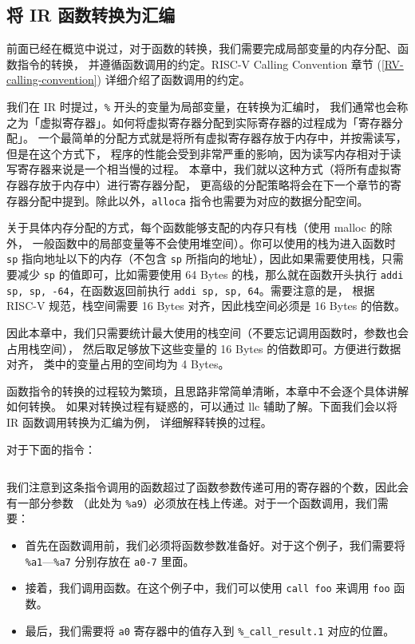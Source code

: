 \subsection{将 IR 函数转换为汇编}\label{IR-func-to-asm}

前面已经在概览中说过，对于函数的转换，我们需要完成局部变量的内存分配、函数指令的转换，
并遵循函数调用的约定。RISC-V Calling Convention 章节
(\ref{RV-calling-convention}) 详细介绍了函数调用的约定。

我们在 IR 时提过，\texttt{\%} 开头的变量为局部变量，在转换为汇编时，
我们通常也会称之为「虚拟寄存器」。如何将虚拟寄存器分配到实际寄存器的过程成为「寄存器分配」。
一个最简单的分配方式就是将所有虚拟寄存器存放于内存中，并按需读写，但是在这个方式下，
程序的性能会受到非常严重的影响，因为读写内存相对于读写寄存器来说是一个相当慢的过程。
本章中，我们就以这种方式（将所有虚拟寄存器存放于内存中）进行寄存器分配，
更高级的分配策略将会在下一个章节的寄存器分配中提到。除此以外，\texttt{alloca}
指令也需要为对应的数据分配空间。

关于具体内存分配的方式，每个函数能够支配的内存只有栈（使用 malloc 的除外，
一般函数中的局部变量等不会使用堆空间）。你可以使用的栈为进入函数时 \texttt{sp}
指向地址以下的内存（不包含 \texttt{sp} 所指向的地址），因此如果需要使用栈，只需要减少
\texttt{sp} 的值即可，比如需要使用 64 Bytes 的栈，那么就在函数开头执行
\texttt{addi sp, sp, -64}，在函数返回前执行 \texttt{addi sp, sp, 64}。需要注意的是，
根据 RISC-V 规范，栈空间需要 16 Bytes 对齐，因此栈空间必须是 16 Bytes 的倍数。

因此本章中，我们只需要统计最大使用的栈空间（不要忘记调用函数时，参数也会占用栈空间），
然后取足够放下这些变量的 16 Bytes 的倍数即可。方便进行数据对齐，
类中的变量占用的空间均为 4 Bytes。

函数指令的转换的过程较为繁琐，且思路非常简单清晰，本章中不会逐个具体讲解如何转换。
如果对转换过程有疑惑的，可以通过 llc 辅助了解。下面我们会以将 IR 函数调用转换为汇编为例，
详细解释转换的过程。

对于下面的指令：
\begin{lstlisting}[language=LLVM]
  %_call_result.1 = call i32 @foo(i32 %a1, i32 %a2, i32 %a3, i32 %a4, i32 %a5, i32 %a6, i32 %a7, i32 %a8, i32 %a9)
\end{lstlisting}

我们注意到这条指令调用的函数超过了函数参数传递可用的寄存器的个数，因此会有一部分参数
（此处为 \texttt{\%a9}）必须放在栈上传递。对于一个函数调用，我们需要：
\begin{itemize}
  \item 首先在函数调用前，我们必须将函数参数准备好。对于这个例子，我们需要将
    \texttt{\%a1}—\texttt{\%a7} 分别存放在 \texttt{a0-7} 里面。
  \item 接着，我们调用函数。在这个例子中，我们可以使用 \texttt{call foo} 来调用
    \texttt{foo} 函数。
  \item 最后，我们需要将 \texttt{a0} 寄存器中的值存入到 \texttt{\%\_call\_result.1}
    对应的位置。
\end{itemize}

